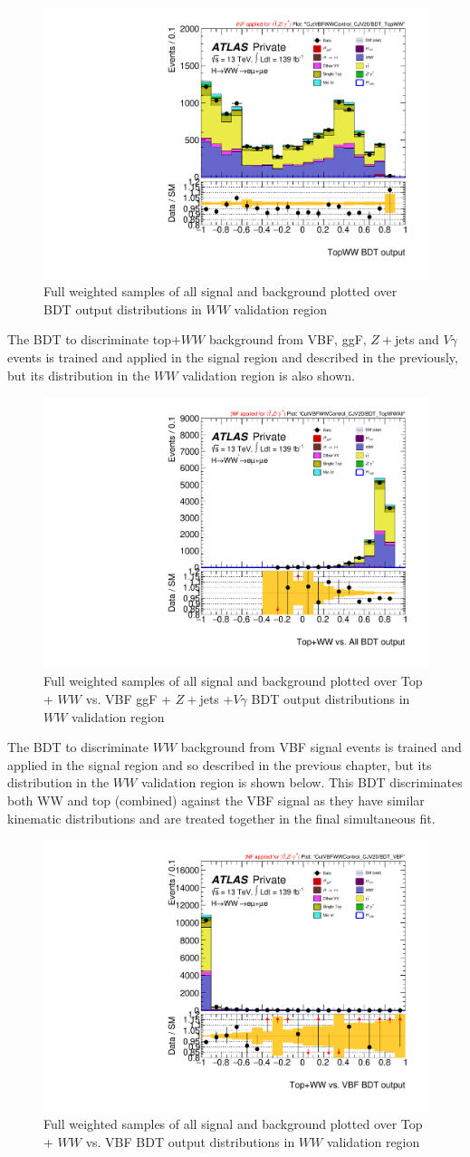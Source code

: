 \begin{figure}[!htbp]
\centering
\includegraphics[width=.4\linewidth]{Pictures/run2-emme-CutVBFWWControl_CJV20-BDT_TopWW-lin.pdf}
\caption{Full weighted samples of all signal and background plotted over BDT output distributions in $WW$ validation region}
\label{fig:TopvWWBDTVR}
\end{figure}

The BDT to discriminate top$+WW$ background from VBF, ggF, $Z+$jets and $V\gamma$ events is trained and applied in the signal region and described in the previously, but its distribution in the $WW$ validation region is also shown. 

\begin{figure}[!htbp]
\centering
\includegraphics[width=.4\linewidth]{Pictures/run2-emme-CutVBFWWControl_CJV20-BDT_TopWWAll-lin.pdf}
\caption{Full weighted samples of all signal and background plotted over Top + $WW$ vs. VBF ggF + $Z+$jets +$V\gamma$ BDT output distributions in $WW$ validation region}
\label{fig:TopvWWBDTVR}
\end{figure}

The BDT to discriminate $WW$ background from VBF signal events is trained and applied in the signal region and so described in the previous chapter, but its distribution in the $WW$ validation region is shown below. This BDT discriminates both WW and top (combined) against the VBF signal as they have similar kinematic distributions and are treated together in the final simultaneous fit.

\begin{figure}[!htbp]
\centering
\includegraphics[width=.4\linewidth]{Pictures/run2-emme-CutVBFWWControl_CJV20-BDT_VBF-lin.pdf}
\caption{Full weighted samples of all signal and background plotted over Top + $WW$ vs. VBF BDT output distributions in $WW$ validation region}
\label{fig:VBFvWWTopBDTVR}
\end{figure}

